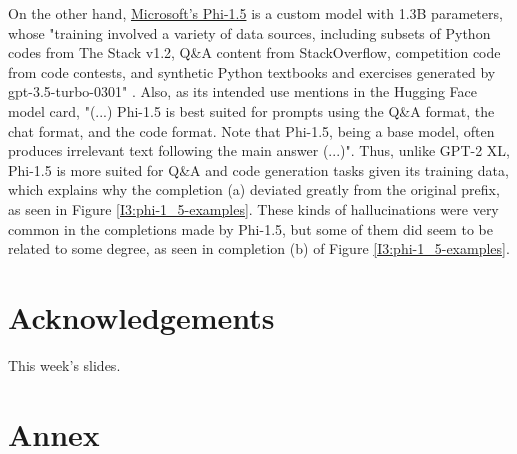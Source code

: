 \documentclass{article}
\begin{document}
On the other hand, \href{https://huggingface.co/microsoft/phi-1\_5}{Microsoft's Phi-1.5} is a custom model with 1.3B parameters, whose "training involved a variety of data sources, including subsets of Python codes from The Stack v1.2, Q\&A content from StackOverflow, competition code from code contests, and synthetic Python textbooks and exercises generated by gpt-3.5-turbo-0301" \cite{huggingfacephi1}. Also, as its intended use mentions in the Hugging Face model card, "(...) Phi-1.5 is best suited for prompts using the Q\&A format, the chat format, and the code format. Note that Phi-1.5, being a base model, often produces irrelevant text following the main answer (...)". Thus, unlike GPT-2 XL, Phi-1.5 is more suited for Q\&A and code generation tasks given its training data, which explains why the completion (a) deviated greatly from the original prefix, as seen in Figure \ref{I3:phi-1_5-examples}. These kinds of hallucinations were very common in the completions made by Phi-1.5, but some of them did seem to be related to some degree, as seen in completion (b) of Figure \ref{I3:phi-1_5-examples}.

\clearpage

\section*{Acknowledgements}
This week's slides.




\clearpage

\section*{Annex}
\end{document}
